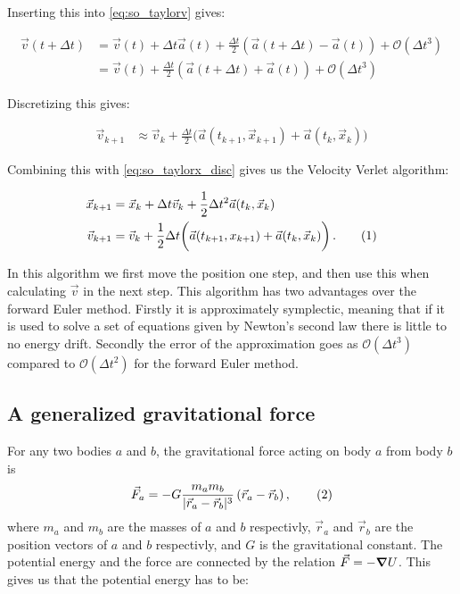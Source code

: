 \documentclass[reprint,english,notitlepage]{revtex4-1}  %
\newcommand\numberthis{\addtocounter{equation}{1}\tag{\theequation}}
\begin{document}
Inserting this into \eqref{eq:so_taylorv} gives:

\begin{align*}
\vec{v}(t+\Delta t) &= \vec{v}(t) + \Delta t \vec{a}(t) + \frac{\Delta t}{2} (\vec{a}(t+ \Delta t ) - \vec{a}(t)) + \mathcal{O}(\Delta t^3) \\
&= \vec{v}(t) + \frac{\Delta t}{2} (\vec{a}(t+ \Delta t ) + \vec{a}(t)) +  \mathcal{O}(\Delta t^3) 
\end{align*}

Discretizing this gives:

\begin{align*}
\vec{v}_{k+1} &\approx \vec{v}_k + \frac{\Delta t}{2} \bigg( \vec{a}(t_{k+1}, \vec{x}_{k+1}) + \vec{a}(t_k, \vec{x}_k) \bigg)
\end{align*}

Combining this with \eqref{eq:so_taylorx_disc} gives us the Velocity Verlet algorithm:

\begin{align*}
\vec{x}_{k+1} &= \vec{x}_k + \Delta t \vec{v}_k + \frac{1}{2} \Delta t^2 \vec{a}(t_k,\vec{x}_k) \\
\vec{v}_{k+1} &= \vec{v}_k + \frac{1}{2}\Delta t \bigg( \vec{a}(t_{k+1},x_{k+1}) + \vec{a}(t_k, \vec{x}_k) \bigg) \, . \numberthis \label{eq:VelocityVerlet}
\end{align*}

In this algorithm we first move the position one step, and then use this when calculating $\vec{v}$ in the next step. This algorithm has two advantages over the forward Euler method. Firstly it is approximately symplectic, meaning that if it is used to solve a set of equations given by Newton's second law there is little to no energy drift. Secondly the error of the approximation goes as $\mathcal{O}(\Delta t^3)$ compared to $\mathcal{O}(\Delta t^2)$ for the forward Euler method.

\subsection{A generalized gravitational force} \label{sec:II:b}
For any two bodies \(a\) and \(b\), the gravitational force acting on body \(a\) from body \(b\) is
\begin{align*}
	\vec{F}_{a} = -G\frac{m_{a}m_{b}}{|\vec{r}_{a}-\vec{r}_{b}|^{3}}\left(\vec{r}_{a}-\vec{r}_{b}\right), \numberthis \label{eq:grav} \\
\end{align*}
where \(m_{a}\) and \(m_{b}\) are the masses of \(a\) and \(b\) respectivly, \(\vec{r}_{a}\) and \(\vec{r}_{b}\) are the position vectors of \(a\) and \(b\) respectivly, and \(G\) is the gravitational constant. The potential energy and the force are connected by the relation $\vec{F} = - \gradient U$. This gives us that the potential energy has to be:
\end{document}
